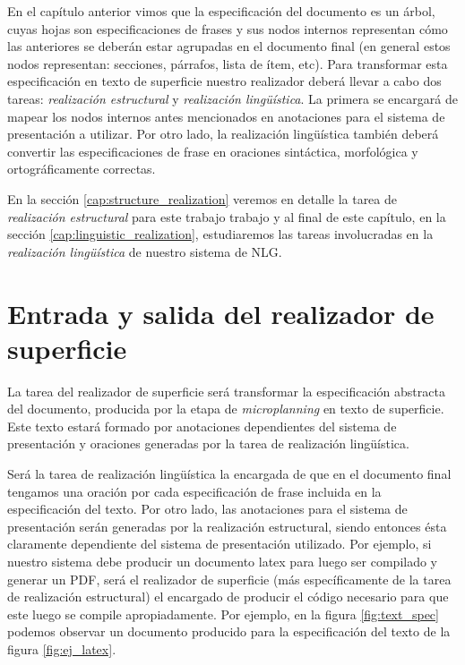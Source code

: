 En el capítulo anterior vimos que la especificación del documento es un árbol, cuyas hojas son especificaciones de frases y sus nodos internos representan cómo las anteriores se deberán estar agrupadas en el documento final (en general estos nodos representan: secciones, párrafos, lista de ítem, etc). Para transformar esta especificación en texto de superficie nuestro realizador deberá llevar a cabo dos tareas: \emph{realización estructural} y \emph{realización lingüística}. La primera se encargará de mapear los nodos internos antes mencionados en anotaciones para el sistema de presentación a utilizar. Por otro lado, la realización lingüística también deberá convertir las especificaciones de frase en oraciones sintáctica, morfológica y ortográficamente correctas.

En la sección \ref{cap:structure_realization} veremos en detalle la tarea de \emph{realización estructural} para este trabajo trabajo y al final de este capítulo, en la sección \ref{cap:linguistic_realization}, estudiaremos las tareas involucradas en la \emph{realización lingüística} de nuestro sistema de NLG.

\section{Entrada y salida del realizador de superficie}

La tarea del realizador de superficie será transformar la especificación abstracta del documento, producida por la etapa de \textit{microplanning} en texto de superficie. Este texto estará formado por anotaciones dependientes del sistema de presentación y oraciones generadas por la tarea de realización lingüística.

Será la tarea de realización lingüística la encargada de que en el documento final tengamos una oración por cada especificación de frase incluida en la especificación del texto. Por otro lado, las anotaciones para el sistema de presentación serán generadas por la realización estructural, siendo entonces ésta claramente dependiente del sistema de presentación utilizado. Por ejemplo, si nuestro sistema debe producir un documento latex para luego ser compilado y generar un PDF, será el realizador de superficie (más específicamente de la tarea de realización estructural) el encargado de producir el código necesario para que este luego se compile apropiadamente. Por ejemplo, en la figura \ref{fig:text_spec} podemos observar un documento producido para la especificación del texto de la figura \ref{fig:ej_latex}.


